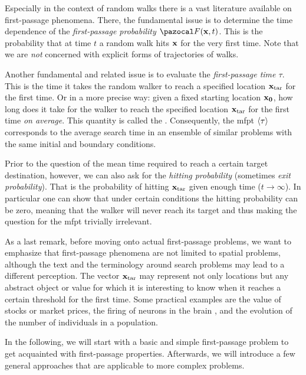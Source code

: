 Especially in the context of random walks there is a vast literature available on first-passage phenomena. There, the fundamental issue is to determine the time dependence of the \textit{first-passage probability} $\F(\bv{x},t)$. This is the probability that at time $t$ a random walk hits $\mathbf{x}$ for the very first time. Note that we are \emph{not} concerned with explicit forms of trajectories of walks.

Another fundamental and related issue is to evaluate the \textit{first-passage time $\tau$}. This is the time it takes the random walker to reach a specified location $\mathbf{x}_\textrm{tar}$ for the first time. Or in a more precise way: given a fixed starting location $\mathbf{x_0}$, how long does it take for the walker to reach the specified location $\mathbf{x}_\textrm{tar}$ for the first time \emph{on average}. This quantity is called the . Consequently, the \ac{mfpt} $\left<\tau\right>$ corresponds to the average search time in an ensemble of similar problems with the same initial and boundary conditions.

Prior to the question of the mean time required to reach a certain target destination, however, we can also ask for the \textit{hitting probability} (sometimes \textit{exit probability}). That is the probability of hitting $\mathbf{x}_\textrm{tar}$ given enough time ($t\rightarrow\infty$). In particular one can show that under certain conditions the hitting probability can be zero, meaning that the walker will never reach its target and thus making the question for the \ac{mfpt} trivially irrelevant.

As a last remark, before moving onto actual first-passage problems, we want to emphasize that first-passage phenomena are not limited to spatial problems, although the text and the terminology around search problems may lead to a different perception. The vector $\mathbf{x}_\textrm{tar}$ may represent not only locations but any abstract object or value for which it is interesting to know when it reaches a certain threshold for the first time. Some practical examples are the value of stocks or market prices, the firing of neurons in the brain \cite{amit:1989}, and the evolution of the number of individuals in a population.

In the following, we will start with a basic and simple first-passage problem to get acquainted with first-passage properties. Afterwards, we will introduce a few general approaches that are applicable to more complex problems.

